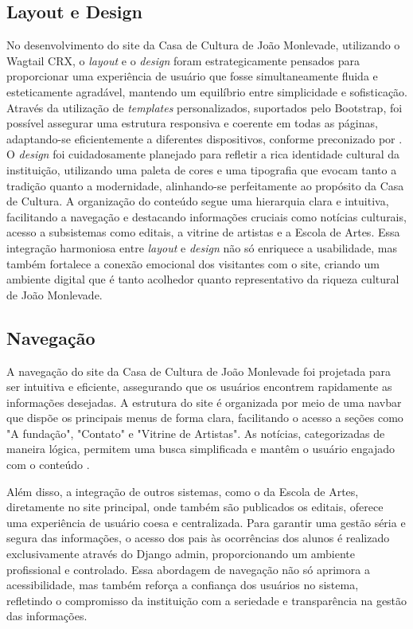 \subsection{Layout e Design}

No desenvolvimento do site da Casa de Cultura de João Monlevade, utilizando o Wagtail CRX, o \textit{layout} e o \textit{design} foram estrategicamente pensados para proporcionar uma experiência de usuário que fosse simultaneamente fluida e esteticamente agradável, mantendo um equilíbrio entre simplicidade e sofisticação. Através da utilização de \textit{templates} personalizados, suportados pelo Bootstrap, foi possível assegurar uma estrutura responsiva e coerente em todas as páginas, adaptando-se eficientemente a diferentes dispositivos, conforme preconizado por . O \textit{design} foi cuidadosamente planejado para refletir a rica identidade cultural da instituição, utilizando uma paleta de cores e uma tipografia que evocam tanto a tradição quanto a modernidade, alinhando-se perfeitamente ao propósito da Casa de Cultura. A organização do conteúdo segue uma hierarquia clara e intuitiva, facilitando a navegação e destacando informações cruciais como notícias culturais, acesso a subsistemas como editais, a vitrine de artistas e a Escola de Artes. Essa integração harmoniosa entre \textit{layout} e \textit{design} não só enriquece a usabilidade, mas também fortalece a conexão emocional dos visitantes com o site, criando um ambiente digital que é tanto acolhedor quanto representativo da riqueza cultural de João Monlevade.

\subsection{Navegação}

A navegação do site da Casa de Cultura de João Monlevade foi projetada para ser intuitiva e eficiente, assegurando que os usuários encontrem rapidamente as informações desejadas. A estrutura do site é organizada por meio de uma navbar que dispõe os principais menus de forma clara, facilitando o acesso a seções como "A fundação", "Contato" e "Vitrine de Artistas". As notícias, categorizadas de maneira lógica, permitem uma busca simplificada e mantêm o usuário engajado com o conteúdo \cite{nielsen2012usability}. 

Além disso, a integração de outros sistemas, como o da Escola de Artes, diretamente no site principal, onde também são publicados os editais, oferece uma experiência de usuário coesa e centralizada. Para garantir uma gestão séria e segura das informações, o acesso dos pais às ocorrências dos alunos é realizado exclusivamente através do Django admin, proporcionando um ambiente profissional e controlado. Essa abordagem de navegação não só aprimora a acessibilidade, mas também reforça a confiança dos usuários no sistema, refletindo o compromisso da instituição com a seriedade e transparência na gestão das informações.

